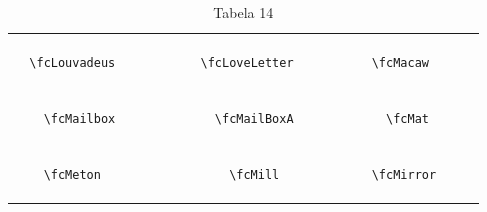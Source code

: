 \documentclass[x11names]{article}
\begin{document}
\begin{table}[H]
\begin{tabular}{|c|c|c|c|c|c|}
		&\multirow{5}{*}{	\fcLouvadeus	[scale=0.16]} & &\multirow{5}{*}{	\fcLoveLetter	[scale=0.16]} & &\multirow{5}{*}{	\fcMacaw	[scale=0.16]}\\	& & & & & \\	& & & & & \\	\verb|	\fcLouvadeus	| & & \verb|	\fcLoveLetter	| & & \verb|	\fcMacaw	| & \\	& & & & & \\	& & & & & \\	& & & & & \\	\hline									
		&\multirow{5}{*}{	\fcMailbox	[scale=0.64]} & &\multirow{5}{*}{	\fcMailBoxA	[scale=0.16]} & &\multirow{5}{*}{	\fcMat	[scale=0.16]}\\	& & & & & \\	& & & & & \\	\verb|	\fcMailbox	| & & \verb|	\fcMailBoxA	| & & \verb|	\fcMat	| & \\	& & & & & \\	& & & & & \\	& & & & & \\	\hline									
		&\multirow{5}{*}{	\fcMeton	[scale=0.16]} & &\multirow{5}{*}{	\fcMill	[scale=0.16]} & &\multirow{5}{*}{	\fcMirror	[scale=0.16]}\\	& & & & & \\	& & & & & \\	\verb|	\fcMeton	| & & \verb|	\fcMill	| & & \verb|	\fcMirror	| & \\	& & & & & \\	& & & & & \\	& & & & & \\		\hline 	\hline 	\end{tabular}	\caption{	Tabela 14	}\label{	Tab14	}\end{table}
\end{document}

